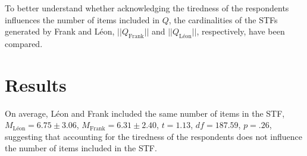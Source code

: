 \documentclass{svproc}
\begin{document}
To better understand whether acknowledging the tiredness of the respondents influences the number of items included in $Q$, the cardinalities of the STFs generated by Frank and Léon, $||Q_{\text{Frank}}||$ and $||Q_{\text{Léon}}||$, respectively, have been compared. 

  

\section{Results}

%

On average, Léon and Frank included the same number of items in the STF, $M_{\text{Léon}} = 6.75 \pm 3.06$, $M_{\text{Frank}} = 6.31 \pm 2.40$, $t = 1.13$, $df = 187.59$, $p = .26$, suggesting that accounting for the tiredness of the respondents does not influence the number of items included in the STF.
\end{document}
